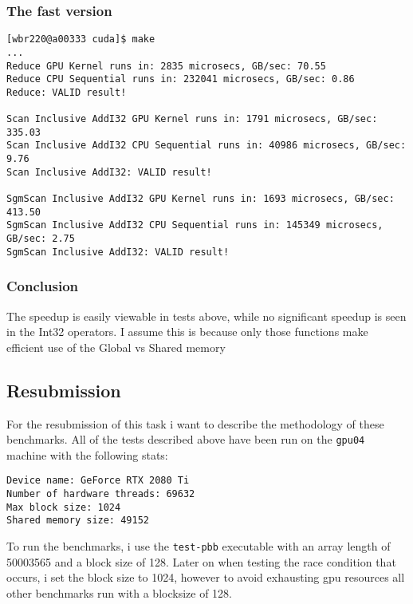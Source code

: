 \documentclass[11pt]{article}
\begin{document}
\subsubsection{The fast version}
\label{sec:orgdb999e9}
\begin{verbatim}
[wbr220@a00333 cuda]$ make
...
Reduce GPU Kernel runs in: 2835 microsecs, GB/sec: 70.55
Reduce CPU Sequential runs in: 232041 microsecs, GB/sec: 0.86
Reduce: VALID result!

Scan Inclusive AddI32 GPU Kernel runs in: 1791 microsecs, GB/sec: 335.03
Scan Inclusive AddI32 CPU Sequential runs in: 40986 microsecs, GB/sec: 9.76
Scan Inclusive AddI32: VALID result!

SgmScan Inclusive AddI32 GPU Kernel runs in: 1693 microsecs, GB/sec: 413.50
SgmScan Inclusive AddI32 CPU Sequential runs in: 145349 microsecs, GB/sec: 2.75
SgmScan Inclusive AddI32: VALID result!
\end{verbatim}
\subsubsection{Conclusion}
\label{sec:orgf5a95d9}
The speedup is easily viewable in tests above, while no significant speedup
is seen in the Int32 operators. I assume this is because only those functions
make efficient use of the Global vs Shared memory

\subsection{Resubmission}
\label{sec:org8a97f47}
For the resubmission of this task i want to describe the methodology of these benchmarks.  
All of the tests described above have been run on the \texttt{gpu04} machine with the
following stats:
\begin{verbatim}
Device name: GeForce RTX 2080 Ti
Number of hardware threads: 69632
Max block size: 1024
Shared memory size: 49152
\end{verbatim}
To run the benchmarks, i use the \texttt{test-pbb} executable with an array length
of 50003565 and a block size of 128. Later on when testing the race condition
that occurs, i set the block size to 1024, however to avoid exhausting gpu resources
all other benchmarks run with a blocksize of 128.
\end{document}
